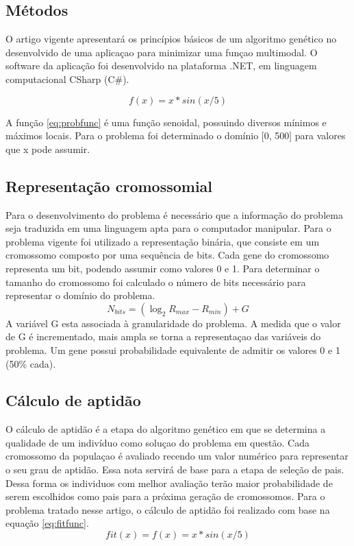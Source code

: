 \documentclass[twoside]{article}
\begin{document}
\begin{multicols}{2}

\section{Métodos}
O artigo vigente apresentará os princípios básicos de um algoritmo genético no desenvolvido de uma aplicaçao para minimizar uma funçao multimodal. O software da aplicação foi desenvolvido na plataforma .NET, em linguagem computacional CSharp (C\#).

\begin{equation}
\label{eq:probfunc}
f(x) = x*sin(x/5)
\end{equation}

A função \ref{eq:probfunc} é uma função senoidal, possuindo diversos mínimos e máximos locais. Para o problema foi determinado o domínio [0, 500] para valores que x pode assumir.

\subsection{Representação cromossomial}
Para o desenvolvimento do problema é necessário que a informação do problema seja traduzida em uma linguagem apta para o computador manipular. Para o problema vigente foi utilizado a representação binária, que consiste em um cromossomo composto por uma sequência de bits. Cada gene do cromossomo representa um bit, podendo assumir como valores 0 e 1. Para determinar o tamanho do cromossomo foi calculado o número de bits necessário para representar o domínio do problema.
\begin{equation}
\label{eq:Funçao do problema}
N_{bits} = ( \log_2 R_{max} - R_{min} ) + G
\end{equation}
A variável G esta associada à granularidade do problema. A medida que o valor de G é incrementado, mais ampla se torna a representaçao das variáveis do problema. Um gene possui probabilidade equivalente de admitir os valores 0 e 1 (50\% cada).

\subsection{Cálculo de aptidão}
O cálculo de aptidão é a etapa do algoritmo genético em que se determina a qualidade de um indivíduo como soluçao do problema em questão. Cada cromossomo da populaçao é avaliado recendo um valor numérico para representar o seu grau de aptidão. Essa nota servirá de base para a etapa de seleção de pais. Dessa forma os individuos com melhor avaliação terão maior probabilidade de serem escolhidos como pais para a próxima geração de cromossomos. Para o problema tratado nesse artigo, o cálculo de aptidão foi realizado com base na equação \ref{eq:fitfunc}.
\begin{equation}
\label{eq:fitfunc}
fit(x) = f(x) = x*sin(x/5)
\end{equation}


\end{multicols}
\end{document}
